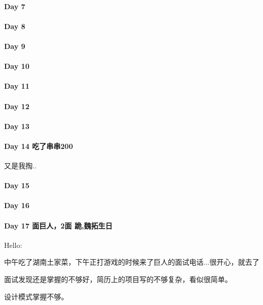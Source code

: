\documentclass[UTF8,a4paper,8pt]{ctexart}
\begin{document}
 	 \paragraph{Day 7       \quad     }
 	 \paragraph{Day 8       \quad     }
 	 \paragraph{Day 9       \quad     }
 	 \paragraph{Day 10      \quad     }
 	 \paragraph{Day 11      \quad     }
 	 \paragraph{Day 12      \quad     }
 	 \paragraph{Day 13      \quad     }
 	 \paragraph{Day 14  吃了串串200    \quad     }
	 	 又是我掏..
	 	 
 	 \paragraph{Day 15      \quad     }
 	 \paragraph{Day 16      \quad     }
 	 \paragraph{Day 17  面巨人，2面 跪,魏拓生日    \quad     }
	 	 Hello:
	 	 
	 	 中午吃了湖南土家菜，下午正打游戏的时候来了巨人的面试电话...很开心，就去了
	 	 
	 	 面试发现还是掌握的不够好，简历上的项目写的不够复杂，看似很简单。
	 	 
	 	 设计模式掌握不够。
	 	 
\end{document}
